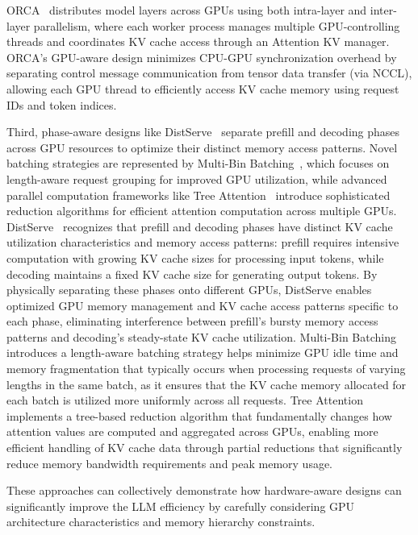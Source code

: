 ORCA~\cite{DBLP:conf/osdi/YuJKKC22} distributes model layers across GPUs using both intra-layer and inter-layer parallelism, where each worker process manages multiple GPU-controlling threads and coordinates KV cache access through an Attention KV manager. ORCA's GPU-aware design minimizes CPU-GPU synchronization overhead by separating control message communication from tensor data transfer (via NCCL), allowing each GPU thread to efficiently access KV cache memory using request IDs and token indices. 

Third, phase-aware designs like DistServe~\cite{DBLP:conf/osdi/ZhongLCHZL0024} separate prefill and decoding phases across GPU resources to optimize their distinct memory access patterns. Novel batching strategies are represented by Multi-Bin Batching~\cite{guldogan2024multibin}, which focuses on length-aware request grouping for improved GPU utilization, while advanced parallel computation frameworks like Tree Attention~\cite{shyam2024treeattentiontopologyawaredecoding} introduce sophisticated reduction algorithms for efficient attention computation across multiple GPUs. 
DistServe~\cite{DBLP:conf/osdi/ZhongLCHZL0024} recognizes that prefill and decoding phases have distinct KV cache utilization characteristics and memory access patterns: prefill requires intensive computation with growing KV cache sizes for processing input tokens, while decoding maintains a fixed KV cache size for generating output tokens. By physically separating these phases onto different GPUs, DistServe enables optimized GPU memory management and KV cache access patterns specific to each phase, eliminating interference between prefill's bursty memory access patterns and decoding's steady-state KV cache utilization. 
Multi-Bin Batching~\cite{guldogan2024multibin} introduces a length-aware batching strategy helps minimize GPU idle time and memory fragmentation that typically occurs when processing requests of varying lengths in the same batch, as it ensures that the KV cache memory allocated for each batch is utilized more uniformly across all requests.
Tree Attention~\cite{shyam2024treeattentiontopologyawaredecoding} implements a tree-based reduction algorithm that fundamentally changes how attention values are computed and aggregated across GPUs, enabling more efficient handling of KV cache data through partial reductions that significantly reduce memory bandwidth requirements and peak memory usage. 

These approaches can collectively demonstrate how hardware-aware designs can significantly improve the LLM  efficiency by carefully considering GPU architecture characteristics and memory hierarchy constraints.

